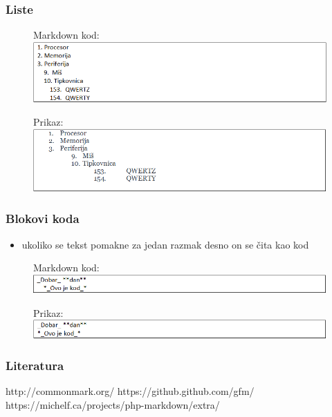 \documentclass{beamer}
\begin{document}
\newpage
\begin{frame}
\frametitle{Liste}
\begin{figure}
{Markdown kod:}
\includegraphics[width = 1.0\linewidth]{Numerirane_liste.png}
\end{figure}

\begin{figure}
{Prikaz:}
\includegraphics[width = 1.0\linewidth]{Numerirane_liste_prikaz.png}
\end{figure}
\end{frame}

\newpage
\begin{frame}
\frametitle{Blokovi koda}

\begin{itemize}
\item ukoliko se tekst pomakne za jedan razmak desno on se čita kao kod
\end{itemize}

\begin{figure}
{Markdown kod:}
\includegraphics[width = 1.0\linewidth]{Blokovi_koda.png}
\end{figure}

\begin{figure}
{Prikaz:}
\includegraphics[width = 1.0\linewidth]{Blokovi_koda_prikaz.png}
\end{figure}


\end{frame}

\newpage
\begin{frame}
\frametitle{Literatura}

\begin{thebibliography}{9}
\beamertemplatetextbibitems
{}
http://commonmark.org/
\beamertemplatetextbibitems
{}
https://github.github.com/gfm/
\beamertemplatetextbibitems
{}
https://michelf.ca/projects/php-markdown/extra/
\end{thebibliography}
\end{frame}
\end{document}
